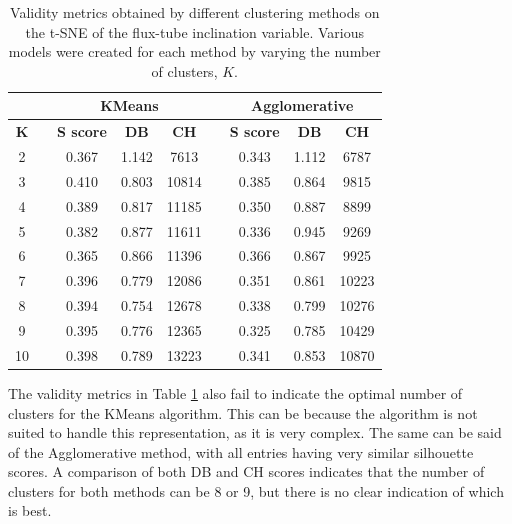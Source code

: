 \begin{table}[]
\caption[Validity metrics for t-SNE of the Flux-tube Inclination]{Validity metrics obtained by different clustering methods on the t-SNE of the flux-tube inclination variable. Various models were created for each method by varying the number of clusters, $K$.}\label{tab:tsne_a}
\begin{tabular}{@{}ccccccccc@{}}
\toprule
           &  & \multicolumn{3}{c}{\textbf{KMeans}}          & \textbf{} & \multicolumn{3}{c}{\textbf{Agglomerative}}   \\ \midrule
\textbf{K} &  & \textbf{S score} & \textbf{DB} & \textbf{CH} & \textbf{} & \textbf{S score} & \textbf{DB} & \textbf{CH} \\ \midrule
2          &  & 0.367            & 1.142       & 7613        &           & 0.343            & 1.112       & 6787        \\
3          &  & 0.410            & 0.803       & 10814       &           & 0.385            & 0.864       & 9815        \\
4          &  & 0.389            & 0.817       & 11185       &           & 0.350            & 0.887       & 8899        \\
5          &  & 0.382            & 0.877       & 11611       &           & 0.336            & 0.945       & 9269        \\
6          &  & 0.365            & 0.866       & 11396       &           & 0.366            & 0.867       & 9925        \\
7          &  & 0.396            & 0.779       & 12086       &           & 0.351            & 0.861       & 10223       \\
8          &  & 0.394            & 0.754       & 12678       &           & 0.338            & 0.799       & 10276       \\
9          &  & 0.395            & 0.776       & 12365       &           & 0.325            & 0.785       & 10429       \\
10         &  & 0.398            & 0.789       & 13223       &           & 0.341            & 0.853       & 10870       \\ \bottomrule
\end{tabular}
\end{table}

The validity metrics in Table \ref{tab:tsne_a} also fail to indicate the optimal number of clusters for the KMeans algorithm. This can be because the algorithm is not suited to handle this representation, as it is very complex. The same can be said of the Agglomerative method, with all entries having very similar silhouette scores. A comparison of both DB and CH scores indicates that the number of clusters for both methods can be 8 or 9, but there is no clear indication of which is best.

